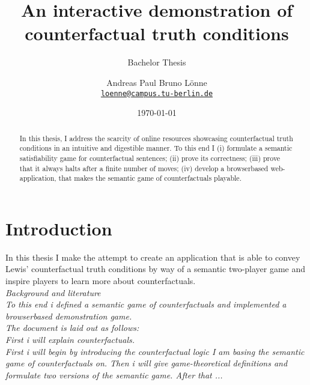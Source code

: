 \documentclass[a4paper,american]{paper}
\date{\today}
\providecommand*{\code}[1]{\texttt{#1}}
\theoremstyle{definition}\newtheorem{definition}{Definition}
\begin{document}
\title{An interactive demonstration of counterfactual truth conditions}

\subtitle{Bachelor Thesis}

\author{%
	Andreas Paul Bruno Lönne\\
	\code{\href{mailto:loenne@campus.tu-berlin.de}{loenne@campus.tu-berlin.de}}
}


\maketitle

\begin{abstract}
In this thesis, I address the scarcity of online resources showcasing counterfactual truth conditions in an intuitive and digestible manner. To this end I (i) formulate a semantic satisfiability game for counterfactual sentences; (ii) prove its correctness; (iii) prove that it always halts after a finite number of moves; (iv) develop a browserbased web-application, that makes the semantic game of counterfactuals playable.
\end{abstract}
\section{Introduction}
In this thesis I make the attempt to create an application that is able to convey Lewis' counterfactual truth conditions by way of a semantic two-player game and inspire players to learn more about counterfactuals.\\
\textit{Background and literature\\
To this end i defined a semantic game of counterfactuals and implemented a browserbased demonstration game.\\
The document is laid out as follows:\\
First i will explain counterfactuals.\\
First i will begin by introducing the counterfactual logic I am basing the semantic game of counterfactuals on. Then i will give game-theoretical definitions and formulate two versions of the semantic game. After that ...}
\end{document}
